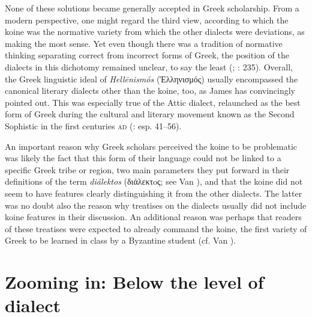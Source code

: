 None of these solutions became generally accepted in Greek scholarship. From a modern perspective, one might regard the third view, according to which the koine was the normative variety from which the other dialects were deviations, as making the most sense. Yet even though there was a tradition of normative thinking separating correct from incorrect forms of Greek, the position of the dialects in this dichotomy remained unclear, to say the least (\citealt{Versteegh1986}; \citealt{Dickey2007}: 235). Overall, the Greek linguistic ideal of \textit{Hellēnismós} (Ἑλληνισμός) usually encompassed the canonical literary dialects other than the koine, too, as James \citet{Clackson2015} has convincingly pointed out. This was especially true of the Attic dialect, relaunched as the best form of Greek during the cultural and literary movement known as the Second Sophistic in the first centuries \textsc{ad} (\citealt{Whitmarsh2005}: esp. 41–56).

An important reason why Greek scholars perceived the koine to be problematic was likely the fact that this form of their language could not be linked to a specific Greek tribe or region, two main parameters they put forward in their definitions of the term \textit{diálektos} (διάλεκτoς; see Van \citealt{Rooy2016d}), and that the koine did not seem to have features clearly distinguishing it from the other dialects. The latter was no doubt also the reason why treatises on the dialects usually did not include koine features in their discussion. An additional reason was perhaps that readers of these treatises were expected to already command the koine, the first variety of Greek to be learned in class by a Byzantine student (cf. Van \citealt{Rooy2016b}).

\section{Zooming in: Below the level of dialect}


